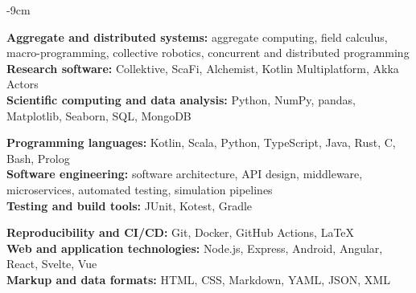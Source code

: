 \documentclass[10pt,a4paper]{altacv}
\begin{document}
%
%
%

    \begin{adjustwidth}{}{-9cm}
    \small


    \textbf{Aggregate and distributed systems:}
    aggregate computing, field calculus, macro-programming,
    collective robotics, concurrent and distributed programming\\

    \textbf{Research software:}
    Collektive, ScaFi, Alchemist, Kotlin Multiplatform, Akka Actors\\

    \textbf{Scientific computing and data analysis:}
    Python, NumPy, pandas, Matplotlib, Seaborn, SQL, MongoDB

    \divider


    \textbf{Programming languages:}
    Kotlin, Scala, Python, TypeScript, Java, Rust, C, Bash, Prolog\\

    \textbf{Software engineering:}
    software architecture, API design, middleware, microservices,
    automated testing, simulation pipelines\\

    \textbf{Testing and build tools:}
    JUnit, Kotest, Gradle

    \divider


    \textbf{Reproducibility and CI/CD:}
    Git, Docker, GitHub Actions, LaTeX\\

    \textbf{Web and application technologies:}
    Node.js, Express, Android, Angular, React, Svelte, Vue\\

    \textbf{Markup and data formats:}
    HTML, CSS, Markdown, YAML, JSON, XML

    \normalsize
    \end{adjustwidth}
\end{document}
